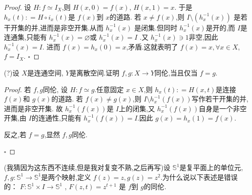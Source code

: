 \documentclass[../../几何与拓扑.tex]{subfiles}
\begin{document}
\begin{problemset}
\begin{proof}
        设 \(  H: f \simeq  I _{X}  \),则 \(  H\left( x,0 \right)=  f\left( x \right)    \),  \(  H\left( x,1 \right) =  x   \). 于是 \(  h _{x}\left( t \right) : =  H\circ i_{x}\left( t \right)    \)是 \(  f\left( x \right)   \)到 \(  x  \)的道路.      
        若 \(  x \neq  f\left( x \right)   \),则 \(  I \setminus \left( h_{x}^{-1} \left( x \right)  \right)  \)  是若干开集的并,进而是非空开集.从而 \(  h_{x}^{-1} \left( x \right)   \)  是闭集.但同时 \(  h_{x}^{-1} \left( x \right)   \)是开的,而 \(  I  \)是连通集,只能有 \(  h_{x}^{-1} \left( x \right)= \varnothing   \)或 \(  h_{x}^{-1} \left( x \right)=  I   \)    .又 \(  h_{x}^{-1} \left( x \right) \ni 1   \)非空,因此 \(  h_{x}^{-1} \left( x \right) =  I   \).
        进而 \(  f\left( x \right)= h_{x}\left( 0 \right) =  x    \),矛盾.这就表明了 \(  f\left( x \right) =  x, \forall  x \in X   \), \(  f =  I _{X}  \).     
        \hfill $\square$
    \end{proof}

    \item {(?)}设 \(  X  \)是连通空间, \(  Y  \)是离散空间.证明 \(  f,g: X\to Y  \)同伦,当且仅当 \(  f =  g  \).
    
    \begin{proof}
    
        若 \(  f,g  \)同伦, 设 \(  H: f \simeq g  \).任意固定 \(  x \in X  \),则 \(  h_{x}\left( t \right): =  H\left( x,t \right)    \)是连接 \(  f\left( x \right)   \)和 \(  g\left( x \right)   \)的道路.
        若 \(  f\left( x \right)\neq  g\left( x \right)    \),则  \(  I \setminus h_{x}^{-1} \left( f\left( x \right)  \right)   \)写作若干开集的并,进而是非空开集.
        故 \(  h_{x}^{-1} \left( f\left( x \right)  \right)   \)是 \(  I  \)上的闭集,又 \(  h_{x}^{-1} \left( f\left( x \right)  \right)   \)自身是一个非空开集,由 \(  I  \)的连通性,只能有 \( h_{x}^{-1} \left( f\left( x \right)\right)  = I   \).因此 \(  g\left( x \right)=  h_{x}\left( 1 \right)=  f\left( x \right)     \).
        
        
        反之,若 \(  f =  g  \),显然 \(  f,g  \)同伦.  
    
        \hfill $\square$
    \end{proof}

    \item {(我猜因为这东西不连续,但是我对复变不熟,之后再写)}设 \(  \mathbb{S}^{1}  \)是复平面上的单位元,\(  f,g: \mathbb{S}^{1} \to \mathbb{S}^{1}  \)是两个映射,定义 \(  f\left( z \right) =  z,g\left( z \right)= z^{2}    \).为什么说以下表述是错误的：  \(  F: \mathbb{S}^{1} \times I   \to \mathbb{S}^{1}\) , \(  F\left( z,t \right) =  z^{t+ 1}   \) 是 \(  f  \)到 \(  g  \)的同伦.  


\end{problemset}
\end{document}
